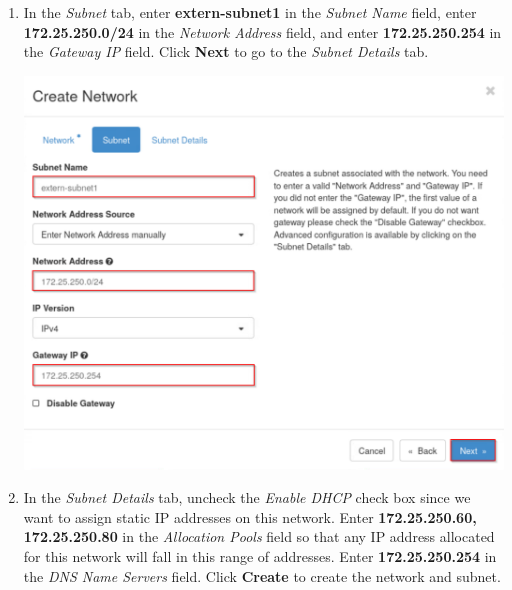 \documentclass[letterpaper, 12pt]{article}
\begin{document}
\begin{enumerate}
    \item In the \textit{Subnet} tab, enter \textbf{extern-subnet1} in the \textit{Subnet Name} field, enter
    \textbf{172.25.250.0/24} in the \textit{Network Address} field, and enter \textbf{172.25.250.254} in the
    \textit{Gateway IP} field.  Click \textbf{Next} to go to the \textit{Subnet Details} tab.

    \begin{center}
        \includegraphics[width=\linewidth]{images/part1/step8.png}
    \end{center}

    \item In the \textit{Subnet Details} tab, uncheck the \textit{Enable DHCP} check box since we want to assign static
    IP addresses on this network. Enter \textbf{172.25.250.60, 172.25.250.80} in the \textit{Allocation Pools} field so
    that any IP address allocated for this network will fall in this range of addresses. Enter \textbf{172.25.250.254}
    in the \textit{DNS Name Servers} field. Click \textbf{Create} to create the network and subnet.


\end{enumerate}
\end{document}
